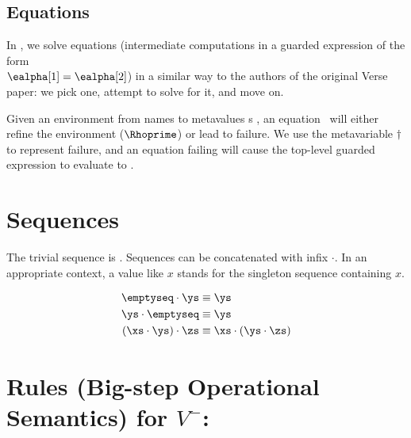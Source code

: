 \documentclass[]{article}
\begin{document}
    
    \bigskip
\subsection{Equations}

In \VMinus, we solve equations (intermediate computations in a guarded
expression of the form \\$\ealpha[1] = \ealpha[2]$) in a similar way to the
authors of the original Verse paper: we pick one, attempt to solve for it, and
move on. 


Given an environment from names to metavalues {\valpha}s \Rho, an equation \eq
~will either refine the environment ($\Rhoprime$) or lead to failure. We use
the metavariable $\dagger$ to represent failure, and an equation failing will
cause the top-level guarded expression to evaluate to \reject. 

{}\eqfail
    
    
    \section{Sequences}
    
    The trivial sequence is \emptyseq. Sequences can be concatenated with infix 
$\cdot$. In an appropriate context, a value like $x$ stands for 
the singleton sequence containing $x$. 

\begin{align*}
    \emptyseq \cdot \ys &\equiv \ys \\
    \ys \cdot \emptyseq &\equiv \ys \\
    (\xs \cdot \ys) \cdot \zs &\equiv \xs \cdot (\ys \cdot \zs)
\end{align*}

\section{Rules (Big-step Operational Semantics) for $V^{-}$:}
    
\end{document}
